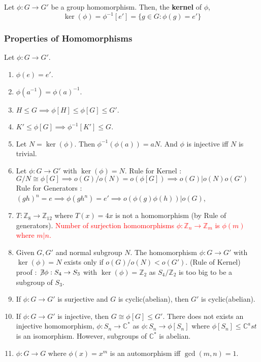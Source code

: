 \begin{definition}
	Let $\phi : G \to G'$ be a group homomorphism.
	Then, the \textbf{kernel} of $\phi$, 
	$$ \ker(\phi) = \phi^{-1}[e'] = \{ g \in G : \phi(g) = e' \} $$
\end{definition}

\subsubsection{Properties of Homomorphisms}
Let $\phi : G \to G'$.
\begin{enumerate}
	\item $\phi(e) = e'$.
	\item $\phi(a^{-1}) = \phi(a)^{-1}$.
	\item $H \le G \implies \phi[H] \le \phi[G] \le G'$.
	\item $K' \le \phi[G] \implies \phi^{-1}[K'] \le G$.
	\item Let $N = \ker(\phi)$. Then $\phi^{-1}(\phi(a)) = aN$. And $\phi$ is injective iff $N$ is trivial.
	\item Let $\phi : G \to G'$ with $\ker(\phi)=N$.
		\subitem Rule for Kernel : $G/N \cong \phi[G] \implies o(G)/o(N) = o(\phi[G]) \implies o(G) | o(N)o(G')$
		\subitem Rule for Generators : $(gh)^n = e \implies \phi(gh^n) = e' \implies o(\phi(g) \phi(h))|o(G)$,
	\item $T : \mathbb{Z}_8 \to \mathbb{Z}_{12}$ where $T(x)=4x$ is not a homomorphism (by Rule of generators).
		\subitem \textcolor{red}{Number of surjection homomorphisms $\phi : \mathbb{Z}_n \to \mathbb{Z}_m$ is $\phi(m)$ where $m|n$.}
	\item Given $G,G'$ and normal subgroup $N$. The homomorphism $\phi : G \to G'$ with $\ker(\phi)=N$ exists only if $o(G)/o(N) < o(G')$. (Rule of Kernel)\\
	proof : $\not\!\exists \phi : S_4 \to S_3$ with $\ker(\phi) = \mathbb{Z}_2$ as $S_4/\mathbb{Z}_2$ is too big to be a subgroup of $S_3$.
	\item If $\phi : G \to G'$ is surjective and $G$ is cyclic(abelian), then $G'$ is cyclic(abelian).
	\item If $\phi : G \to G'$ is injective, then $G \cong \phi[G] \le G'$.
		\subitem There does not exists an injective homomorphism, $\phi : S_n \to \mathbb{C}^\ast$ as $\phi : S_n \to \phi[S_n]$ where $\phi[S_n] \le \mathbb{C}^ast$ is an isomorphism. However, subgroups of $\mathbb{C}^\ast$ is abelian.
	\item $\phi : G \to G$ where $\phi(x)=x^m$ is an automorphism iff $\gcd(m,n) = 1$.
\end{enumerate}


